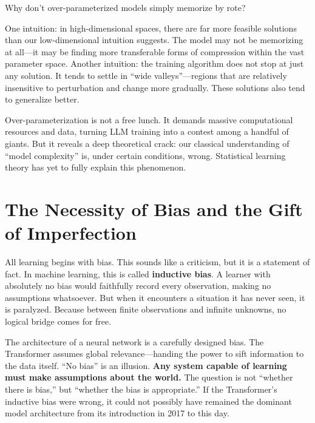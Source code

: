 \vspace{1em}



Why don't over-parameterized models simply memorize by rote?

One intuition: in high-dimensional spaces, there are far more feasible solutions than our low-dimensional intuition suggests. The model may not be memorizing at all---it may be finding more transferable forms of compression within the vast parameter space.
Another intuition: the training algorithm does not stop at just any solution. It tends to settle in ``wide valleys''---regions that are relatively insensitive to perturbation and change more gradually. These solutions also tend to generalize better.

\vspace{1em}

Over-parameterization is not a free lunch.
It demands massive computational resources and data, turning LLM training into a contest among a handful of giants. But it reveals a deep theoretical crack: our classical understanding of ``model complexity'' is, under certain conditions, wrong. Statistical learning theory has yet to fully explain this phenomenon.

\newpage
\section{The Necessity of Bias and the Gift of Imperfection}

All learning begins with bias. This sounds like a criticism, but it is a statement of fact. In machine learning, this is called \textbf{inductive bias}.
A learner with absolutely no bias would faithfully record every observation, making no assumptions whatsoever. But when it encounters a situation it has never seen, it is paralyzed. Because between finite observations and infinite unknowns, no logical bridge comes for free.

The architecture of a neural network is a carefully designed bias. The Transformer assumes global relevance---handing the power to sift information to the data itself. ``No bias'' is an illusion. \textbf{Any system capable of learning must make assumptions about the world.} The question is not ``whether there is bias,'' but ``whether the bias is appropriate.'' If the Transformer's inductive bias were wrong, it could not possibly have remained the dominant model architecture from its introduction in 2017 to this day.

